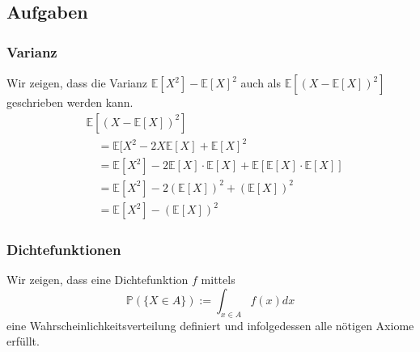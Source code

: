 \subsection{Aufgaben}
\subsubsection{Varianz}
Wir zeigen, dass die Varianz
 $\mathbb{E} [X^2] - \mathbb{E} [X]^2$ auch als $\mathbb{E} [(X- \mathbb{E} [X] )^2 ]$ geschrieben werden kann.	
\begin{align*}
&\mathbb{E} [(X- \mathbb{E} [X] )^2 ] \\
&\quad= \mathbb{E} [X^2 - 2X \mathbb{E} [X] + \mathbb{E} [X]^2 \\
&\quad= \mathbb{E} [X^2] - 2\mathbb{E} [X] \cdot \mathbb{E} [X] + \mathbb{E} [\mathbb{E} [X] \cdot \mathbb{E} [X]]\\
&\quad= \mathbb{E} [X^2] - 2(\mathbb{E} [X])^2 + (\mathbb{E} [X])^2\\
&\quad= \mathbb{E} [X^2] - (\mathbb{E} [X])^2
\end{align*}


\subsubsection{Dichtefunktionen}
Wir zeigen, dass eine Dichtefunktion $f$ mittels
\begin{equation*}
\mathbb{P}(\{X\in A\}):=\int_{x\in A}f(x)dx
\end{equation*}
eine Wahrscheinlichkeitsverteilung definiert und infolgedessen alle nötigen Axiome erfüllt.

